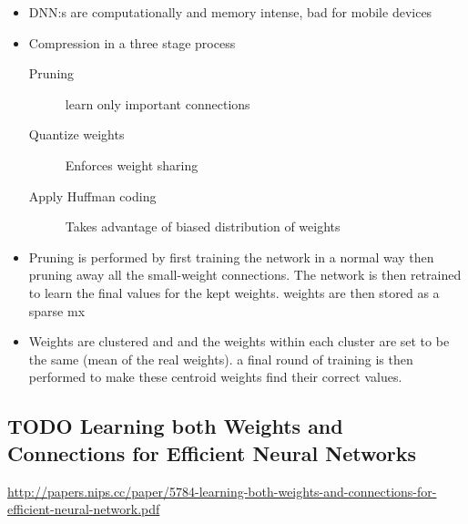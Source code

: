 \documentclass[11pt]{article}
\begin{document}
\begin{itemize}
\item DNN:s are computationally and memory intense, bad for mobile devices
\item Compression in a three stage process
\begin{description}
\item[{Pruning}] learn only important connections
\item[{Quantize weights}] Enforces weight sharing
\item[{Apply Huffman coding}] Takes advantage of biased distribution of weights
\end{description}
\item Pruning is performed by first training the network in a normal way then pruning away all the small-weight connections. The network is then retrained to learn the final values for the kept weights. weights are then stored as a sparse mx
\item Weights are clustered and and the weights within each cluster are set to be the same (mean of the real weights). a final round of training is then performed to make these centroid weights find their correct values.
\end{itemize}

\subsection{{\bfseries\sffamily TODO} Learning both Weights and Connections for Efficient Neural Networks}
\label{sec:orgf5f5968}
\url{http://papers.nips.cc/paper/5784-learning-both-weights-and-connections-for-efficient-neural-network.pdf}
\end{document}
